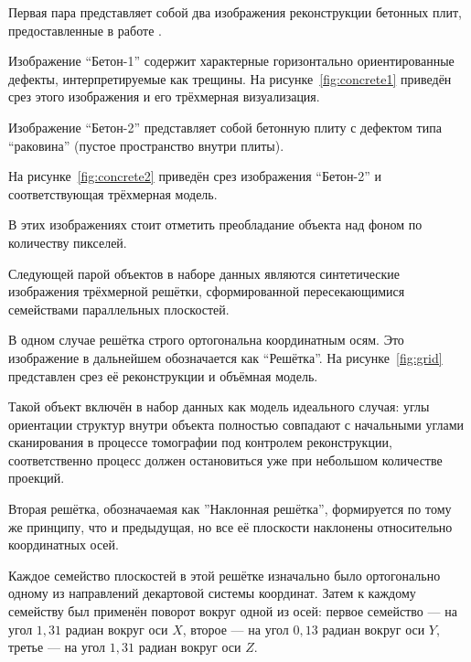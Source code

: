 Первая пара представляет собой два изображения реконструкции бетонных плит, предоставленные в работе \cite{wagner2023comparative}.

Изображение ``Бетон-1'' содержит характерные горизонтально ориентированные дефекты, интерпретируемые как трещины. На рисунке~\ref{fig:concrete1} приведён срез этого изображения и его трёхмерная визуализация.


Изображение ``Бетон-2'' представляет собой бетонную плиту с дефектом типа ``раковина'' (пустое пространство внутри плиты).

На рисунке~\ref{fig:concrete2} приведён срез изображения ``Бетон-2'' и соответствующая трёхмерная модель.


В этих изображениях стоит отметить преобладание объекта над фоном по количеству пикселей.

Следующей парой объектов в наборе данных являются синтетические изображения трёхмерной решётки, сформированной пересекающимися семействами параллельных плоскостей. 

В одном случае решётка строго ортогональна координатным осям. Это изображение в дальнейшем обозначается как ``Решётка''. На рисунке~\ref{fig:grid} представлен срез её реконструкции и объёмная модель.

Такой объект включён в набор данных как модель идеального случая: углы ориентации структур внутри объекта полностью совпадают с начальными углами сканирования в процессе томографии под контролем реконструкции, соответственно процесс должен остановиться уже при небольшом количестве проекций.


Вторая решётка, обозначаемая как ''Наклонная решётка'', формируется по тому же принципу, что и предыдущая, но все её плоскости наклонены относительно координатных осей.

Каждое семейство плоскостей в этой решётке изначально было ортогонально одному из направлений декартовой системы координат. Затем к каждому семейству был применён поворот вокруг одной из осей: первое семейство — на угол \(1{,}31\) радиан вокруг оси \(X\), второе — на угол \(0{,}13\) радиан вокруг оси \(Y\), третье — на угол \(1{,}31\) радиан вокруг оси \(Z\).

